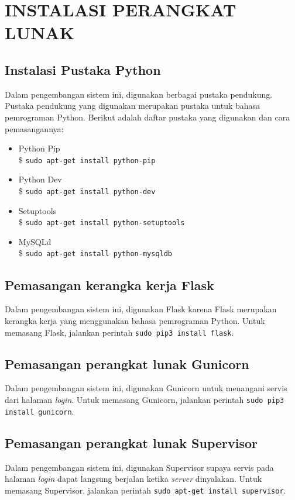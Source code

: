 \chapter{INSTALASI PERANGKAT LUNAK}

\section*{Instalasi Pustaka Python} \label{install:pythonlibrary}
	Dalam pengembangan sistem ini, digunakan berbagai pustaka pendukung. Pustaka pendukung yang digunakan merupakan pustaka untuk bahasa pemrograman Python. Berikut adalah daftar pustaka yang digunakan dan cara pemasangannya:
    \begin{itemize}
	 \item Python Pip\\
		 \$ \texttt{sudo apt-get install python-pip}
    \item Python Dev \\
    	\$ \texttt{sudo apt-get install python-dev}
    \item Setuptools \\
    	\$ \texttt{sudo apt-get install python-setuptools}
    \item MySQLd \\
    	\$ \texttt{sudo apt-get install python-mysqldb}
    \end{itemize}
	
\section*{Pemasangan kerangka kerja Flask}
Dalam pengembangan sistem ini, digunakan Flask karena Flask merupakan kerangka kerja yang menggunakan bahasa pemrograman Python. Untuk memasang Flask, jalankan perintah \texttt{sudo pip3 install flask}.

\section*{Pemasangan perangkat lunak Gunicorn}
Dalam pengembangan sistem ini, digunakan Gunicorn untuk menangani servis dari halaman \textit{login}. Untuk memasang Gunicorn, jalankan perintah \texttt{sudo pip3 install gunicorn}.

\section*{Pemasangan perangkat lunak Supervisor}
Dalam pengembangan sistem ini, digunakan Supervisor supaya servis pada halaman \textit{login} dapat langsung berjalan ketika \textit{server} dinyalakan. Untuk memasang Supervisor, jalankan perintah \texttt{sudo apt-get install supervisor}.

